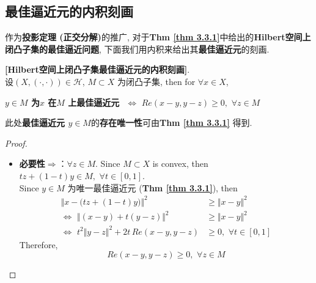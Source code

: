 \newpage

\subsection{最佳逼近元的内积刻画}
	作为\textbf{投影定理 (正交分解)}的推广, 对于\textbf{Thm \ref{thm 3.3.1}}中给出的\textbf{Hilbert空间上闭凸子集的最佳逼近问题}, 下面我们用内积来给出其\textbf{最佳逼近元}的刻画. 
	
	\vspace{1em}
	
	\begin{thm}\label{thm 3.3.3}
		\textbf{[Hilbert空间上闭凸子集最佳逼近元的内积刻画]}. \\
		设$(X , (\cdot , \cdot)) \in \mathcal{H}$, $M \subset X$ 为闭凸子集, then for $\forall x \in X$, 
		\begin{center}
			\textbf{$y \in M$ 为$x$ 在$M$ 上最佳逼近元 $\,\, \Leftrightarrow \,\, Re (x - y , y - z) \geq 0 , \,\, \forall z \in M$}
		\end{center}
	
		\vspace{2em}
		
		\begin{rmk}
			此处\textbf{最佳逼近元 $y \in M$}的\textbf{存在唯一性}可由\textbf{Thm \ref{thm 3.3.1}} 得到. 
		\end{rmk}
		
		\vspace{4em}
		
		\begin{proof}
			\begin{itemize}
				\item \textbf{必要性$\Rightarrow$}：$\forall z \in M$. Since $M \subset X$ is convex, then $tz + (1 - t)y \in M , \,\, \forall t \in [0 , 1]$.  \\
				Since $y \in M$ 为唯一最佳逼近元 (\textbf{Thm \ref{thm 3.3.1}}), then
				\begin{align}
					\Big\Vert x - \Big( tz + (1 - t)y \Big) \Big\Vert^2 
					&\geq \Vert x - y \Vert^2 \\
					\Leftrightarrow \,\, \Big\Vert (x - y) + t(y - z) \Big\Vert^2 
					&\geq \Vert x - y \Vert^2 \\
					\Leftrightarrow \,\, t^2 \Vert y - z \Vert^2 + 2t \, Re(x - y , y - z) 
					&\geq 0 , \,\, \forall t \in [0 , 1]
				\end{align}
				Therefore, 
				\[ Re(x - y , y - z) \geq 0 , \,\, \forall z \in M \]
				
				\vspace{4em}
				

\end{itemize}
\end{proof}
\end{thm}

